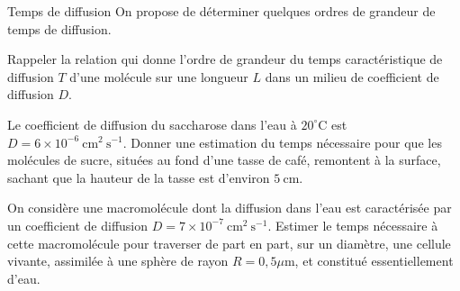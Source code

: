 \begin{exo}[PC][1][TD]{Temps de diffusion}
  On propose de déterminer quelques ordres de grandeur de temps de diffusion.
  \begin{quest}
  \item Rappeler la relation qui donne l'ordre de grandeur du temps caractéristique de diffusion $T$ d'une molécule sur une longueur $L$ dans un milieu de coefficient de diffusion $D$.
  \item Le coefficient de diffusion du saccharose dans l'eau à $20^{\circ} \mathrm{C}$ est $D=6 \times 10^{-6} \mathrm{~cm}^{2} \mathrm{~s}^{-1}$. Donner une estimation du temps nécessaire pour que les molécules de sucre, situées au fond d'une tasse de café, remontent à la surface, sachant que la hauteur de la tasse est d'environ $5 \mathrm{~cm}$.

  \item On considère une macromolécule dont la diffusion dans l'eau est caractérisée par un coefficient de diffusion $D=7 \times 10^{-7} \mathrm{~cm}^{2} \mathrm{~s}^{-1}$. Estimer le temps nécessaire à cette macromolécule pour traverser de part en part, sur un diamètre, une cellule vivante, assimilée à une sphère de rayon $R=0,5 \mu \mathrm{m}$, et constitué essentiellement d'eau.

\end{quest}
\end{exo}


